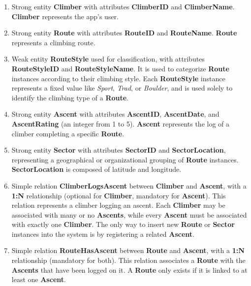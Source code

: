 \documentclass[12pt, a4paper]{article}
\begin{document}
\begin{enumerate}
    \item Strong entity \textbf{Climber} with attributes \textbf{ClimberID} and \textbf{ClimberName}.  
    \textbf{Climber} represents the app's user.

    \item Strong entity \textbf{Route} with attributes \textbf{RouteID} and \textbf{RouteName}.  
    \textbf{Route} represents a climbing route.

    \item Weak entity \textbf{RouteStyle} used for classification, with attributes \textbf{RouteStyleID} and \textbf{RouteStyleName}.  
    It is used to categorize \textbf{Route} instances according to their climbing style.  
    Each \textbf{RouteStyle} instance represents a fixed value like \textit{Sport}, \textit{Trad}, or \textit{Boulder}, and is used solely to identify the climbing type of a \textbf{Route}.

    \item Strong entity \textbf{Ascent} with attributes \textbf{AscentID}, \textbf{AscentDate}, and \textbf{AscentRating} (an integer from 1 to 5).  
    \textbf{Ascent} represents the log of a climber completing a specific \textbf{Route}.

    \item Strong entity \textbf{Sector} with attributes \textbf{SectorID} and \textbf{SectorLocation}, representing a geographical or organizational grouping of \textbf{Route} instances.  
    \textbf{SectorLocation} is composed of latitude and longitude.

    \item Simple relation \textbf{ClimberLogsAscent} between \textbf{Climber} and \textbf{Ascent}, with a \textbf{1:N} relationship (optional for \textbf{Climber}, mandatory for \textbf{Ascent}).  
    This relation represents a climber logging an ascent.  
    Each \textbf{Climber} may be associated with many or no \textbf{Ascents}, while every \textbf{Ascent} must be associated with exactly one \textbf{Climber}.  
    The only way to insert new \textbf{Route} or \textbf{Sector} instances into the system is by registering a related \textbf{Ascent}.

    \item Simple relation \textbf{RouteHasAscent} between \textbf{Route} and \textbf{Ascent}, with a \textbf{1:N} relationship (mandatory for both).  
    This relation associates a \textbf{Route} with the \textbf{Ascents} that have been logged on it.  
    A \textbf{Route} only exists if it is linked to at least one \textbf{Ascent}.


\end{enumerate}
\end{document}
